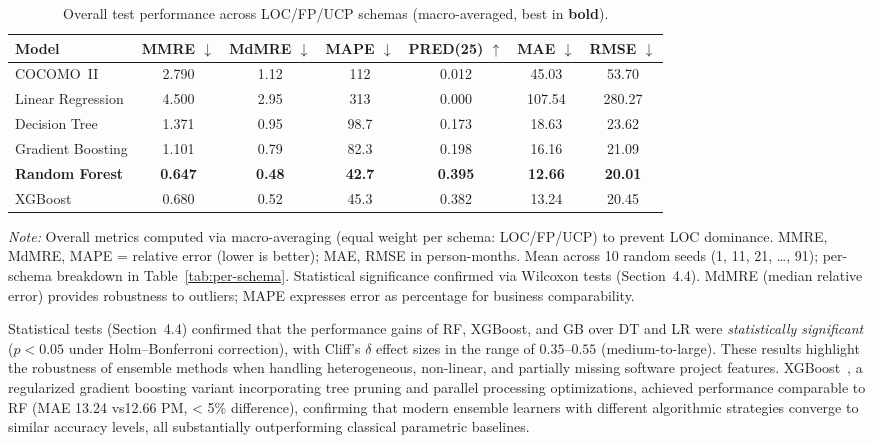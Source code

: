 \documentclass[11pt,a4paper]{article}
\begin{document}
\begin{table}[h]
\centering
\caption{Overall test performance across LOC/FP/UCP schemas (macro-averaged, best in \textbf{bold}).}
\label{tab:overall}
\small
\begin{tabular}{lcccccc}
\toprule
Model & MMRE $\downarrow$ & MdMRE $\downarrow$ & MAPE $\downarrow$ & PRED(25) $\uparrow$ & MAE $\downarrow$ & RMSE $\downarrow$ \\
\midrule
COCOMO~II & 2.790 & 1.12 & 112 & 0.012 & 45.03 & 53.70 \\
Linear Regression & 4.500 & 2.95 & 313 & 0.000 & 107.54 & 280.27 \\
Decision Tree & 1.371 & 0.95 & 98.7 & 0.173 & 18.63 & 23.62 \\
Gradient Boosting & 1.101 & 0.79 & 82.3 & 0.198 & 16.16 & 21.09 \\
\textbf{Random Forest} & \textbf{0.647} & \textbf{0.48} & \textbf{42.7} & \textbf{0.395} & \textbf{12.66} & \textbf{20.01} \\
XGBoost & 0.680 & 0.52 & 45.3 & 0.382 & 13.24 & 20.45 \\
\bottomrule
\end{tabular}
\vspace{0.3em}

\raggedright\footnotesize
\textit{Note:} Overall metrics computed via macro-averaging (equal weight per schema: LOC/FP/UCP) to prevent LOC dominance. MMRE, MdMRE, MAPE = relative error (lower is better); MAE, RMSE in person-months. Mean across 10 random seeds (1, 11, 21, \ldots, 91); per-schema breakdown in Table~\ref{tab:per-schema}. Statistical significance confirmed via Wilcoxon tests (Section~4.4). MdMRE (median relative error) provides robustness to outliers; MAPE expresses error as percentage for business comparability.
\end{table}

Statistical tests (Section~4.4) confirmed that the performance gains of 
RF, XGBoost, and GB over DT and LR were \textit{statistically significant} ($p < 0.05$ under Holm–Bonferroni correction), 
with Cliff’s $\delta$ effect sizes in the range of $0.35$–$0.55$ (medium-to-large).  
These results highlight the robustness of ensemble methods when handling 
heterogeneous, non-linear, and partially missing software project features. XGBoost~\cite{chen2016xgboost}, a regularized gradient boosting variant incorporating tree pruning and parallel processing optimizations, achieved performance comparable to RF (MAE 13.24 vs12.66 PM, < 5\% difference), confirming that modern ensemble learners with different algorithmic strategies converge to similar accuracy levels, all substantially outperforming classical parametric baselines.
\end{document}
